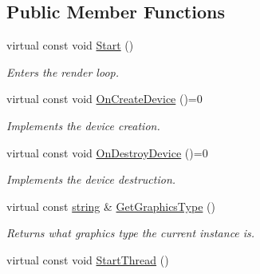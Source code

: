 \subsection*{Public Member Functions}
\begin{DoxyCompactItemize}
\item 
virtual const void \hyperlink{class_ensum_1_1_graphics_1_1_graphics_a79cd1971eb83f2b53707a1f71c764c9b}{Start} ()
\begin{DoxyCompactList}\small\item\em Enters the render loop. \end{DoxyCompactList}\item 
virtual const void \hyperlink{class_ensum_1_1_graphics_1_1_graphics_a22a9971757d8c9f56e4006ac50219995}{On\+Create\+Device} ()=0\hypertarget{class_ensum_1_1_graphics_1_1_graphics_a22a9971757d8c9f56e4006ac50219995}{}\label{class_ensum_1_1_graphics_1_1_graphics_a22a9971757d8c9f56e4006ac50219995}

\begin{DoxyCompactList}\small\item\em Implements the device creation. \end{DoxyCompactList}\item 
virtual const void \hyperlink{class_ensum_1_1_graphics_1_1_graphics_af26be2e7d907fc3ebaa587d12be9870c}{On\+Destroy\+Device} ()=0\hypertarget{class_ensum_1_1_graphics_1_1_graphics_af26be2e7d907fc3ebaa587d12be9870c}{}\label{class_ensum_1_1_graphics_1_1_graphics_af26be2e7d907fc3ebaa587d12be9870c}

\begin{DoxyCompactList}\small\item\em Implements the device destruction. \end{DoxyCompactList}\item 
virtual const \hyperlink{class_ensum_1_1string}{string} \& \hyperlink{class_ensum_1_1_graphics_1_1_graphics_ab336b7193886a85365b831eb34ecdc96}{Get\+Graphics\+Type} ()\hypertarget{class_ensum_1_1_graphics_1_1_graphics_ab336b7193886a85365b831eb34ecdc96}{}\label{class_ensum_1_1_graphics_1_1_graphics_ab336b7193886a85365b831eb34ecdc96}

\begin{DoxyCompactList}\small\item\em Returns what graphics type the current instance is. \end{DoxyCompactList}\item 
virtual const void \hyperlink{class_ensum_1_1_graphics_1_1_graphics_af653ac5e04559d540521f297c1b45109}{Start\+Thread} ()\hypertarget{class_ensum_1_1_graphics_1_1_graphics_af653ac5e04559d540521f297c1b45109}{}\label{class_ensum_1_1_graphics_1_1_graphics_af653ac5e04559d540521f297c1b45109}


\end{DoxyCompactItemize}
